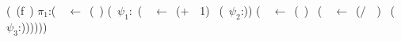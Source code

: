 \vspace*{-.2cm}
        {\small
        \renewcommand{\arraystretch}{1}{
          \begin{uprogram}
             (\DEFINE~(f~\px)
              $\pi_1$:(\LET~\py~$\leftarrow $\
 (\length~\px) \IN
              (\SIF~$\psi_1$:\py~(\LET~\pz~$\leftarrow$~(+~\py~1)~\IN
             \UNL{7} (\SRETURN~$\psi_2$:\pz))   
              (\LET~\pu~$\leftarrow$~(\Sum~\px)~\IN
              (\LET~\pw~$\leftarrow$\ (/~\pu~\py)~\IN
              (\SRETURN~$\psi_3$:\pw))))))
        \end{uprogram}}
}
\vspace*{.1cm}
